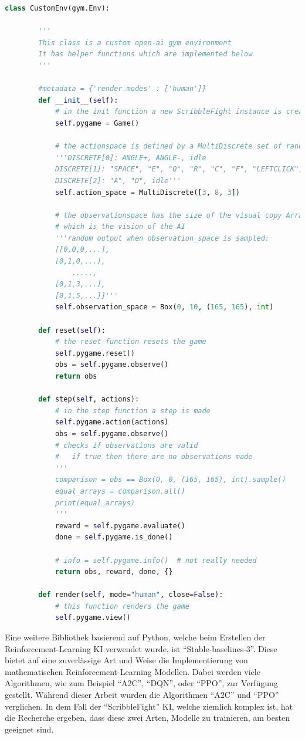 \begin{lstlisting}[language=Python,firstnumber=5]
    class CustomEnv(gym.Env):

        '''
        This class is a custom open-ai gym environment
        It has helper functions which are implemented below
        '''

        #metadata = {'render.modes' : ['human']}
        def __init__(self):
            # in the init function a new ScribbleFight instance is created
            self.pygame = Game()
            
            # the actionspace is defined by a MultiDiscrete set of random numbers
            '''DISCRETE[0]: ANGLE+, ANGLE-, idle
            DISCRETE[1]: "SPACE", "E", "Q", "R", "C", "F", "LEFTCLICK", idle
            DISCRETE[2]: "A", "D", idle'''
            self.action_space = MultiDiscrete([3, 8, 3])

            # the observationspace has the size of the visual copy Array (165x165), 
            # which is the vision of the AI
            '''random output when observation_space is sampled:
            [[0,0,0,...],
            [0,1,0,...],
                .....,
            [0,1,3,...],
            [0,1,5,...]]'''
            self.observation_space = Box(0, 10, (165, 165), int)

        def reset(self):
            # the reset function resets the game
            self.pygame.reset()
            obs = self.pygame.observe()
            return obs

        def step(self, actions):
            # in the step function a step is made
            self.pygame.action(actions)
            obs = self.pygame.observe()
            # checks if observations are valid
            #   if true then there are no observations made
            ''' 
            comparison = obs == Box(0, 0, (165, 165), int).sample()
            equal_arrays = comparison.all()
            print(equal_arrays)
            '''
            reward = self.pygame.evaluate()
            done = self.pygame.is_done()

            # info = self.pygame.info()  # not really needed
            return obs, reward, done, {}

        def render(self, mode="human", close=False):
            # this function renders the game
            self.pygame.view()

\end{lstlisting}


Eine weitere Bibliothek basierend auf Python, welche beim Erstellen der Reinforcement-Learning KI verwendet wurde, ist ``Stable-baselines-3''. Diese bietet auf eine zuverlässige Art und Weise die Implementierung von mathematischen Reinforcement-Learning Modellen. Dabei werden viele Algorithmen, wie zum Beispiel ``A2C'', ``DQN'', oder ``PPO'', zur Verfügung gestellt. Während dieser Arbeit wurden die Algorithmen ``A2C'' und ``PPO'' verglichen. In dem Fall der ``ScribbleFight'' KI, welche ziemlich komplex ist, hat die Recherche ergeben, dass diese zwei Arten, Modelle zu trainieren, am besten geeignet sind.

